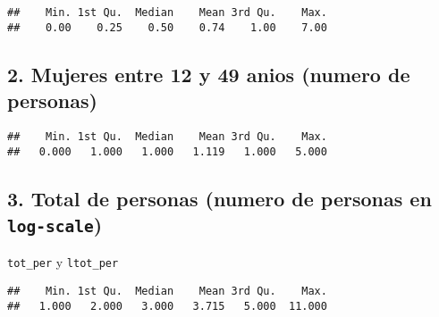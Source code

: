 \documentclass[11pt,]{article}
\newenvironment{Shaded}{\begin{snugshade}}{\end{snugshade}}
\newcommand{\KeywordTok}[1]{\textcolor[rgb]{0.13,0.29,0.53}{\textbf{#1}}}
\newcommand{\StringTok}[1]{\textcolor[rgb]{0.31,0.60,0.02}{#1}}
\newcommand{\CommentTok}[1]{\textcolor[rgb]{0.56,0.35,0.01}{\textit{#1}}}
\newcommand{\OperatorTok}[1]{\textcolor[rgb]{0.81,0.36,0.00}{\textbf{#1}}}
\newcommand{\NormalTok}[1]{#1}
\begin{document}
\begin{verbatim}
##    Min. 1st Qu.  Median    Mean 3rd Qu.    Max. 
##    0.00    0.25    0.50    0.74    1.00    7.00
\end{verbatim}

\subsection{2. Mujeres entre 12 y 49 anios (numero de
personas)}\label{mujeres-entre-12-y-49-anios-numero-de-personas}

\begin{Shaded}
\end{Shaded}

\begin{verbatim}
##    Min. 1st Qu.  Median    Mean 3rd Qu.    Max. 
##   0.000   1.000   1.000   1.119   1.000   5.000
\end{verbatim}

\subsection{\texorpdfstring{3. Total de personas (numero de personas en
\texttt{log-scale})}{3. Total de personas (numero de personas en log-scale)}}\label{total-de-personas-numero-de-personas-en-log-scale}

\texttt{tot\_per} y \texttt{ltot\_per}

\begin{Shaded}
\end{Shaded}

\begin{verbatim}
##    Min. 1st Qu.  Median    Mean 3rd Qu.    Max. 
##   1.000   2.000   3.000   3.715   5.000  11.000
\end{verbatim}
\end{document}
